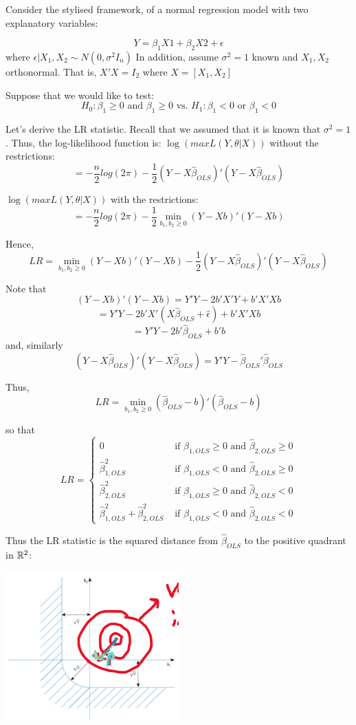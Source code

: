 \documentclass[DIV=14,titlepage=false]{scrreprt}
\begin{document}
Consider the stylised framework, of a normal regression model with two explanatory variables:

\[Y=\beta_1X1+\beta_2X2+\epsilon\]
where \(\epsilon|X_1,X_2\sim N(0,\sigma^2I_n)\) In addition, assume \(\sigma^2=1\) known and \(X_1,X_2\) orthonormal. That is, \(X'X=I_2\) where \(X=[X_1,X_2]\)

Suppose that we would like to test:
\[H_0:\beta_1\geq0 \text{ and } \beta_1\geq0 \text{ vs. }H_1:\beta_1<0 \text{ or } \beta_1<0\]

Let's derive the LR statistic. Recall that we assumed that it is known that \(\sigma^2=1\). Thus, the log-likelihood function is:
\(\log (max L(Y,\theta|X))\) without the restrictions:
\[=-\frac{n}{2}log(2\pi)-\frac{1}{2}(Y-X\hat{\beta}_{OLS})'(Y-X\hat{\beta}_{OLS})\]

\(\log (max L(Y,\theta|X))\) with the restrictions:
\[=-\frac{n}{2}log(2\pi)-\frac{1}{2}\operatorname*{min}_{b_1,b_2\geq0}(Y-Xb)'(Y-Xb)\]

Hence,
\[LR=\operatorname*{min}_{b_1,b_2\geq0}(Y-Xb)'(Y-Xb)-\frac{1}{2}(Y-X\hat{\beta}_{OLS})'(Y-X\hat{\beta}_{OLS})\]

Note that
\[(Y-Xb)'(Y-Xb)=Y'Y-2b'X'Y+b'X'Xb\]
\[=Y'Y-2b'X'(X\hat\beta_{OLS}+\hat\epsilon)+b'X'Xb\]
\[=Y'Y-2b'\hat\beta_{OLS}+b'b\]
and, similarly
\[(Y-X\hat\beta_{OLS})'(Y-X\hat\beta_{OLS})=Y'Y-\hat\beta_{OLS}'\hat\beta_{OLS}\]

Thus,
\[LR=\operatorname*{min}_{b_1,b_2\geq0}(\hat\beta_{OLS}-b)'(\hat\beta_{OLS}-b)\]

so that
\[LR=\begin{cases}0 & \text{ if }\hat\beta_{1,OLS}\geq0 \text{ and } \hat\beta_{2,OLS}\geq0
\\ \hat\beta_{1,OLS}^2 & \text{ if }\hat\beta_{1,OLS}<0 \text{ and } \hat\beta_{2,OLS}\geq0
\\ \hat\beta_{2,OLS}^2 & \text{ if }\hat\beta_{1,OLS}\geq0 \text{ and } \hat\beta_{2,OLS}<0
\\ \hat\beta_{1,OLS}^2+\hat\beta_{2,OLS}^2 & \text{ if }\hat\beta_{1,OLS}<0 \text{ and } \hat\beta_{2,OLS}<0
\end{cases}\]

Thus the LR statistic is the squared distance from \(\hat\beta_{OLS}\) to the positive quadrant in \(\mathbb{R}^2\):
\begin{center}
\includegraphics[width=0.5\textwidth]{./Images/LR test.png}
\end{center}
\end{document}
